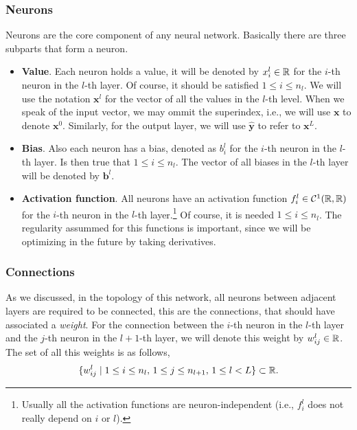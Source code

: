 \subsubsection{Neurons}
Neurons are the core component of any neural network. Basically there are three
subparts that form a neuron.
\begin{itemize}
  \item \textbf{Value}. Each neuron holds a value, it will be denoted by
  \(x_i^l \in \mathbb{R}\) for the \(i\)-th neuron in the \(l\)-th layer. Of course, it
  should be satisfied \(1 \leq i \leq n_l\). We will use the notation
  \(\mathbf{x}^l\) for the vector of all the values in the \(l\)-th level. When
  we speak of the input vector, we may ommit the superindex, i.e., we will use
  \(\mathbf{x}\) to denote \(\mathbf{x}^0\). Similarly, for the output layer,
  we will use \(\mathbf{\hat{y}}\) to refer to \(\mathbf{x}^L\).
  \item \textbf{Bias}. Also each neuron has a bias, denoted as \(b_i^l\) for
  the \(i\)-th neuron in the \(l\)-th layer. Is then true that
  \(1 \leq i \leq n_l\). The vector of all biases in the \(l\)-th layer will be
  denoted by \(\mathbf{b}^l\).
  \item \textbf{Activation function}. All neurons have an activation function
  \(f_i ^ l \in \mathcal{C} ^ 1 (\mathbb{R}, \mathbb{R})\) for the \(i\)-th neuron in the
  \(l\)-th layer.\footnote{Usually all the activation functions are
    neuron-independent (i.e., \(f_i^l\) does not really depend on \(i\) or
    \(l\)).} Of course, it is needed \(1 \leq i \leq n_l\). The regularity
  assummed for this functions is important, since we will be optimizing in the
  future by taking derivatives.
\end{itemize}

\subsubsection{Connections}
As we discussed, in the topology of this network, all neurons between adjacent
layers are required to be connected, this are the connections, that should have
associated a \emph{weight}. For the connection between the \(i\)-th neuron in
the \(l\)-th layer and the \(j\)-th neuron in the \(l + 1\)-th layer, we will
denote this weight by \(w_{ij}^l \in \mathbb{R}\). The set of all this weights is as
follows,
\begin{equation}
  \{w_{ij}^l \mid 1 \leq i \leq n_{l}, \, 1 \leq j \leq n_{l+1}, \,
  1 \leq l < L \} \subset \mathbb{R}.
\end{equation}

